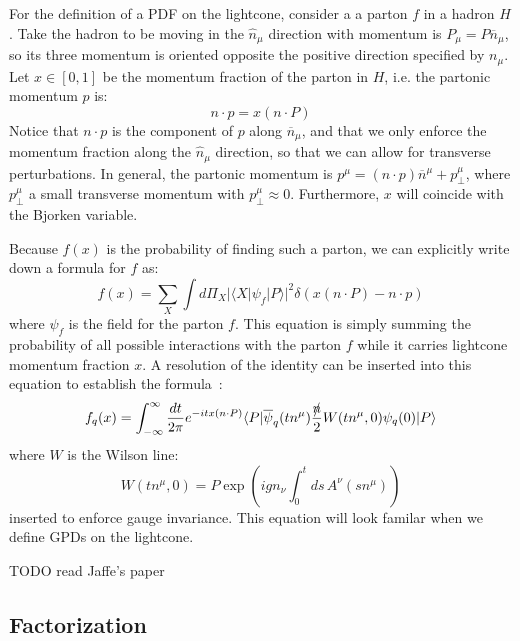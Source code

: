\documentclass[11pt, oneside]{article}   	%
\theoremstyle{definition}
\begin{document}
For the definition of a PDF on the lightcone, consider a a parton $f$ in a hadron $H$. Take the hadron to be moving in the 
$\hat{n}_\mu$ direction with momentum is $P_\mu = P\overline{n}_\mu$, so its three momentum is oriented opposite the 
positive direction specified by $n_\mu$. Let $x\in [0, 1]$ be the momentum fraction of the parton in $H$, i.e. the partonic 
momentum $p$ is:
\begin{equation}
	n\cdot p = x(n\cdot P)
\end{equation}
Notice that $n\cdot p$ is the component of $p$ along $\overline{n}_\mu$, and that we only enforce the momentum fraction 
along the $\hat{n}_\mu$ direction, so that we can allow for transverse perturbations. In general, the partonic momentum 
is $p^\mu = (n\cdot p)\overline{n}^\mu + p_\perp^\mu$, where $p_\perp^\mu$ a small transverse momentum with $p_\perp^\mu\approx 
0$. Furthermore, $x$ will coincide with the Bjorken variable. 

Because $f(x)$ is the probability of finding such a parton, we can explicitly write down a formula for $f$ as:
\begin{equation}
	f(x) = \sum_X\int d\Pi_X |\langle X | \psi_f | P\rangle |^2 \delta\left(x(n\cdot P) - n\cdot p\right)
\end{equation} 
where $\psi_f$ is the field for the parton $f$. This equation is simply summing the probability of all possible interactions with 
the parton $f$ while it carries lightcone momentum fraction $x$. A resolution of the identity can be inserted 
into this equation to establish the formula~\cite{jaffe_pdfs}:
\begin{equation}
	f_q(x) = \int_{-\infty}^\infty \frac{dt}{2\pi} e^{-it x (n\cdot P)} \langle P | \overline\psi_q(tn^\mu) \frac{\slashed n}{2} 
	W(tn^\mu, 0) \psi_q(0) | P\rangle
\end{equation}
where $W$ is the Wilson line:
\begin{equation}
	W(t n^\mu, 0) = P\exp\left(ig n_\nu \int_0^t ds\, A^\nu(s n^\mu)\right)
\end{equation}
inserted to enforce gauge invariance. This equation will look familar when we define GPDs on the lightcone.

TODO read Jaffe's paper~\cite{jaffe_pdfs}

\subsection{Factorization}~
\label{ch:factorization}
\end{document}
